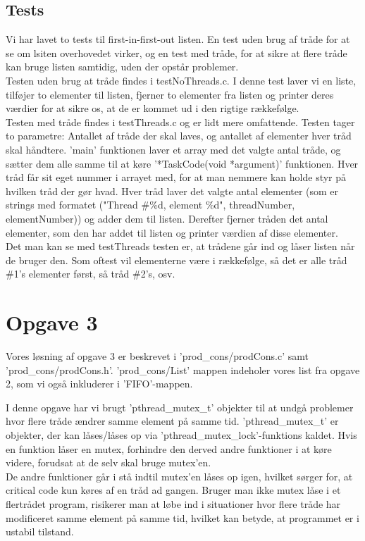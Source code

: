 \subsection{Tests}
\label{O2_Tests}
Vi har lavet to tests til first-in-first-out listen. En test uden brug af tråde for at se om lsiten overhovedet virker, og en test med tråde, for at sikre at flere tråde kan bruge listen samtidig, uden der opstår problemer.
\\Testen uden brug at tråde findes i testNoThreads.c. I denne test laver vi en liste, tilføjer to elementer til listen, fjerner to elementer fra listen og printer deres værdier for at sikre os, at de er kommet ud i den rigtige rækkefølge. 
\\Testen med tråde findes i testThreads.c og er lidt mere omfattende. Testen tager to parametre: Antallet af tråde der skal laves, og antallet af elementer hver tråd skal håndtere. 'main' funktionen laver et array med det valgte antal tråde, og sætter dem alle samme til at køre '*TaskCode(void *argument)' funktionen. Hver tråd får sit eget nummer i arrayet med, for at man nemmere kan holde styr på hvilken tråd der gør hvad. Hver tråd laver det valgte antal elementer (som er strings med formatet ("Thread \#\%d, element \%d", threadNumber, elementNumber)) og adder dem til listen. Derefter fjerner tråden det antal elementer, som den har addet til listen og printer værdien af disse elementer. 
\\Det man kan se med testThreads testen er, at trådene går ind og låser listen når de bruger den. Som oftest vil elementerne være i rækkefølge, så det er alle tråd \#1's elementer først, så tråd \#2's, osv.

\section{Opgave 3}
\label{O3}
Vores løsning af opgave 3 er beskrevet i 'prod\_cons/prodCons.c' samt 'prod\_cons/prodCons.h'. 'prod\_cons/List' mappen indeholer vores list fra opgave 2, som vi også inkluderer i 'FIFO'-mappen.

I denne opgave har vi brugt 'pthread\_mutex\_t' objekter til at undgå problemer hvor flere tråde ændrer samme element på samme tid. 'pthread\_mutex\_t' er objekter, der kan låses/låses op via 'pthread\_mutex\_lock'-funktions kaldet. Hvis en funktion låser en mutex, forhindre den derved andre funktioner i at køre videre, forudsat at de selv skal bruge mutex'en. 
\\De andre funktioner går i stå indtil mutex'en låses op igen, hvilket sørger for, at critical code kun køres af en tråd ad gangen. Bruger man ikke mutex låse i et flertrådet program, risikerer man at løbe ind i situationer hvor flere tråde har modificeret samme element på samme tid, hvilket kan betyde, at programmet er i ustabil tilstand.

